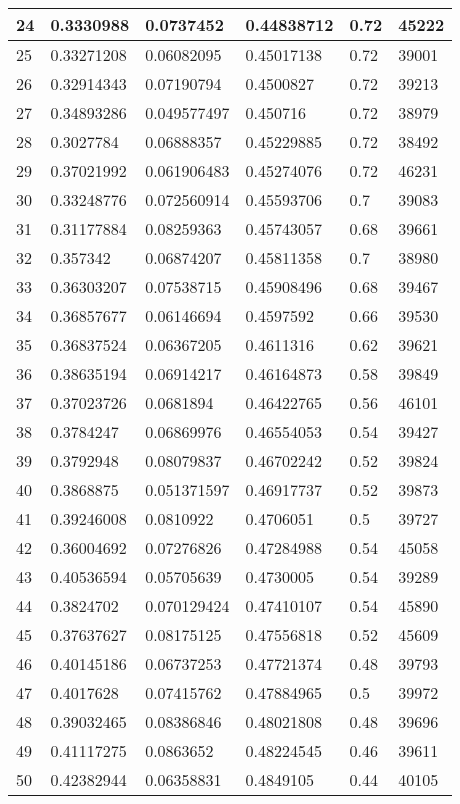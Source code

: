 \begin{longtable}{|l|l|l|l|l|l|}
24 & 0.3330988 & 0.0737452 & 0.44838712 & 0.72 & 45222 \\ \hline 
25 & 0.33271208 & 0.06082095 & 0.45017138 & 0.72 & 39001 \\ \hline 
26 & 0.32914343 & 0.07190794 & 0.4500827 & 0.72 & 39213 \\ \hline 
27 & 0.34893286 & 0.049577497 & 0.450716 & 0.72 & 38979 \\ \hline 
28 & 0.3027784 & 0.06888357 & 0.45229885 & 0.72 & 38492 \\ \hline 
29 & 0.37021992 & 0.061906483 & 0.45274076 & 0.72 & 46231 \\ \hline 
30 & 0.33248776 & 0.072560914 & 0.45593706 & 0.7 & 39083 \\ \hline 
31 & 0.31177884 & 0.08259363 & 0.45743057 & 0.68 & 39661 \\ \hline 
32 & 0.357342 & 0.06874207 & 0.45811358 & 0.7 & 38980 \\ \hline 
33 & 0.36303207 & 0.07538715 & 0.45908496 & 0.68 & 39467 \\ \hline 
34 & 0.36857677 & 0.06146694 & 0.4597592 & 0.66 & 39530 \\ \hline 
35 & 0.36837524 & 0.06367205 & 0.4611316 & 0.62 & 39621 \\ \hline 
36 & 0.38635194 & 0.06914217 & 0.46164873 & 0.58 & 39849 \\ \hline 
37 & 0.37023726 & 0.0681894 & 0.46422765 & 0.56 & 46101 \\ \hline 
38 & 0.3784247 & 0.06869976 & 0.46554053 & 0.54 & 39427 \\ \hline 
39 & 0.3792948 & 0.08079837 & 0.46702242 & 0.52 & 39824 \\ \hline 
40 & 0.3868875 & 0.051371597 & 0.46917737 & 0.52 & 39873 \\ \hline 
41 & 0.39246008 & 0.0810922 & 0.4706051 & 0.5 & 39727 \\ \hline 
42 & 0.36004692 & 0.07276826 & 0.47284988 & 0.54 & 45058 \\ \hline 
43 & 0.40536594 & 0.05705639 & 0.4730005 & 0.54 & 39289 \\ \hline 
44 & 0.3824702 & 0.070129424 & 0.47410107 & 0.54 & 45890 \\ \hline 
45 & 0.37637627 & 0.08175125 & 0.47556818 & 0.52 & 45609 \\ \hline 
46 & 0.40145186 & 0.06737253 & 0.47721374 & 0.48 & 39793 \\ \hline 
47 & 0.4017628 & 0.07415762 & 0.47884965 & 0.5 & 39972 \\ \hline 
48 & 0.39032465 & 0.08386846 & 0.48021808 & 0.48 & 39696 \\ \hline 
49 & 0.41117275 & 0.0863652 & 0.48224545 & 0.46 & 39611 \\ \hline 
50 & 0.42382944 & 0.06358831 & 0.4849105 & 0.44 & 40105 \\ \hline 
\end{longtable}